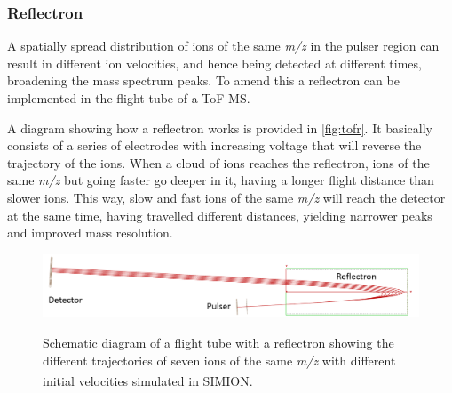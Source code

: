 \subsubsection{Reflectron}
A spatially spread distribution of ions of the same \textit{m/z} in the pulser region can result in different ion velocities, and hence being detected at different times, broadening the mass spectrum peaks.
%
To amend this a reflectron can be implemented in the flight tube of a ToF-MS.

A diagram showing how a reflectron works is provided in \autoref{fig:tofr}. It basically consists of a series of electrodes with increasing voltage that will reverse the trajectory of the ions. When a cloud of ions reaches the reflectron, ions of the same \textit{m/z} but going faster go deeper in it, having a longer flight distance than slower ions. This way, slow and fast ions of the same \textit{m/z} will reach the detector at the same time, having travelled different distances, yielding narrower peaks and  improved mass resolution. %

\begin{figure}%
\centering
\includegraphics[width=0.8\linewidth]{pics/reflectron2.png}\label{fig:tofr_sim}
\caption{Schematic diagram of a flight tube with a reflectron showing the different trajectories of seven ions of the same \textit{m/z} with different initial velocities simulated  in SIMION\textsuperscript{\textregistered}.}
\label{fig:tofr}
\end{figure}







